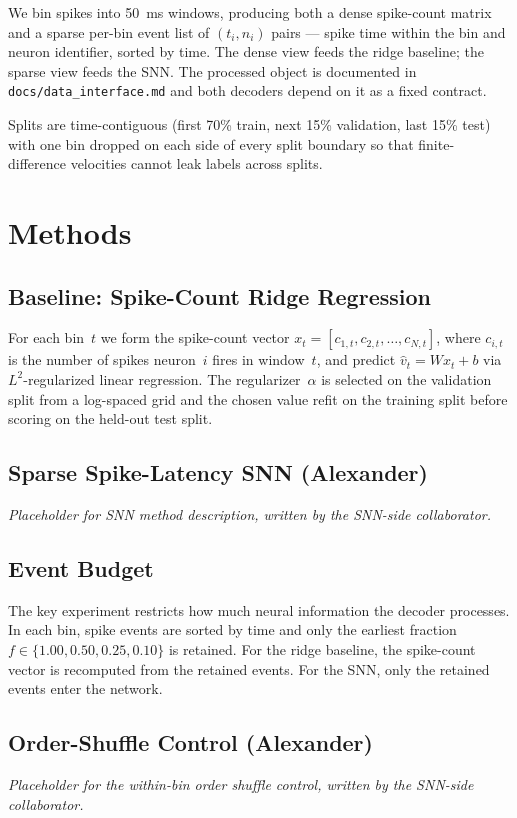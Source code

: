 \documentclass[11pt]{article}
\begin{document}
We bin spikes into 50~ms windows, producing both a dense spike-count
matrix and a sparse per-bin event list of $(t_i, n_i)$ pairs --- spike
time within the bin and neuron identifier, sorted by time. The dense
view feeds the ridge baseline; the sparse view feeds the SNN. The
processed object is documented in \texttt{docs/data\_interface.md} and
both decoders depend on it as a fixed contract.

Splits are time-contiguous (first 70\% train, next 15\% validation,
last 15\% test) with one bin dropped on each side of every split
boundary so that finite-difference velocities cannot leak labels
across splits.

\section{Methods}

\subsection{Baseline: Spike-Count Ridge Regression}
For each bin~$t$ we form the spike-count vector
$x_t = [c_{1,t}, c_{2,t}, \ldots, c_{N,t}]$, where $c_{i,t}$ is the
number of spikes neuron~$i$ fires in window~$t$, and predict
$\hat v_t = W x_t + b$ via $L^2$-regularized linear regression. The
regularizer~$\alpha$ is selected on the validation split from a
log-spaced grid and the chosen value refit on the training split before
scoring on the held-out test split.

\subsection{Sparse Spike-Latency SNN (Alexander)}
\emph{Placeholder for SNN method description, written by the SNN-side
collaborator.}

\subsection{Event Budget}
The key experiment restricts how much neural information the decoder
processes. In each bin, spike events are sorted by time and only the
earliest fraction $f \in \{1.00, 0.50, 0.25, 0.10\}$ is retained. For
the ridge baseline, the spike-count vector is recomputed from the
retained events. For the SNN, only the retained events enter the
network.

\subsection{Order-Shuffle Control (Alexander)}
\emph{Placeholder for the within-bin order shuffle control, written by
the SNN-side collaborator.}
\end{document}
